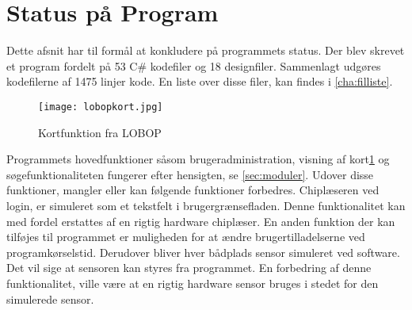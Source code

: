 \newpage
\section{Status på Program} 
\label{sec:status_p_program}



Dette afsnit har til formål at konkludere på programmets status. Der blev skrevet et program fordelt på 53 C\# kodefiler og 18 designfiler. Sammenlagt udgøres kodefilerne af 1475 linjer kode. En liste over disse filer, kan findes i \cref{cha:filliste}. 

\begin{figure}
  \texttt{[image: lobopkort.jpg]}
  \caption{Kortfunktion fra LOBOP}
  \label{fig:lobopkort}
\end{figure}


Programmets hovedfunktioner såsom brugeradministration, visning af kort\cref{fig:lobopkort} og søgefunktionaliteten fungerer efter hensigten, se \cref{sec:moduler}. Udover disse funktioner, mangler eller kan følgende funktioner forbedres. Chiplæseren ved login, er simuleret som et tekstfelt i brugergrænsefladen. Denne funktionalitet kan med fordel erstattes af en rigtig hardware chiplæser. En anden funktion der kan tilføjes til programmet er muligheden for at ændre brugertilladelserne ved programkørselstid. Derudover bliver hver bådplads sensor simuleret ved software. Det vil sige at sensoren kan styres fra programmet. En forbedring af denne funktionalitet, ville være at en rigtig hardware sensor bruges i stedet for den simulerede sensor.




